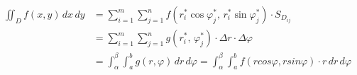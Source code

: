 \documentclass[preview]{standalone}
\begin{document}
\begin{align*}
\iint_D f(x, y)\,dx\,dy &= \sum_{i=1}^m \sum_{j=1}^n f\left(r_i^* \cos\varphi_j^*,\, r_i^* \sin\varphi_j^*\right)\cdot S_{D_{ij}} \\ &= \sum_{i=1}^m \sum_{j=1}^n g\left(r_i^*,\, \varphi_j^*\right)\cdot \Delta r \cdot \Delta \varphi \\ &= \int_{\alpha}^{\beta} \int_{a}^{b} g(r, \varphi)\, dr\, d\varphi = \int_{\alpha}^{\beta} \int_{a}^{b} f(rcos\varphi, rsin\varphi)\cdot r\, dr\, d\varphi
\end{align*}
\end{document}
